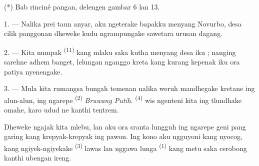 %
%

(*) Bab rinciné pangan, delengen gambar 6 lan 13.

\VUsaut{4.0mm}
\VUsaut{3.0mm}
\VUfilet{16mm}
\VUsaut{5.6mm}
\VUsaut{3.0mm}

\VUsaut{3.0mm}
\VUsaut{3.0mm}

\VUsaut{4.0mm}
\VUsaut{4.0mm}

1. --- Nalika prei taun anyar, aku ngeterake bapakku menyang Novurbo,
desa cilik panggonan dheweke kudu ngrampungake sawetara urusan dagang.

2. --- Kita numpak  \textsuperscript{(11)} kang mlaku
saka kutha menyang desa iku ; nanging sarehne adhem banget, lelungan
nganggo kreta kang kurang kepenak iku ora patiya nyenengake.

3. --- Mula kita rumangsa bungah temenan nalika weruh 
mandhegake kretane ing alun-alun, ing ngarepe 
\textsuperscript{(2)} \textit{Bruwang Putih}. 
\textsuperscript{(4)} wis ngenteni kita ing tlundhake omahe, karo udud
ne kanthi tentrem.

Dheweke ngajak kita mlebu, lan aku ora sranta lungguh ing ngarepe geni
pang garing kang krepyak-krepyak ing pawon. Ing kono aku ngguyoni
 kang nyocog, kang ngiyek-ngiyekake  \textsuperscript{(3)} lawas lan nggawa lunga 
\textsuperscript{(1)} kang metu saka cerobong kanthi ubengan ireng.

